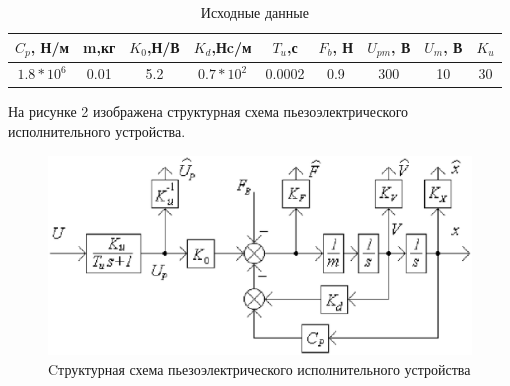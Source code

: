\documentclass[12pt, a4paper]{article}
\begin{document}
\begin{table}[h!]
\centering
\begin{threeparttable}
\caption{Исходные данные}
\renewcommand{\arraystretch}{1.8}
\begin{tabular}{ |c|c|c|c|c|c|c|c|c|} 
 \hline
 $C_{p}$, Н/м & m,кг & $K_{0}$,Н/В & $K_{d}$,Нc/м & $T_{u}$,с & $F_{b}$, Н & $U_{pm}$, В &$U_{m}$, В & $K_{u}$ \\ 
 \hline
  $1.8*10^6$ & 0.01 & 5.2 & $0.7*10^2$ & 0.0002 & 0.9 & 300 & 10 & 30 \\ 
 \hline
\end{tabular}
\end{threeparttable}
\end{table}
\par На рисунке 2 изображена структурная схема пьезоэлектрического исполнительного устройства.
\begin{figure}[H]
\centering
\includegraphics[width=\textwidth]{1/srukt.eps}
\caption{Cтруктурная схема пьезоэлектрического исполнительного устройства}
\end{figure}
\end{document}
